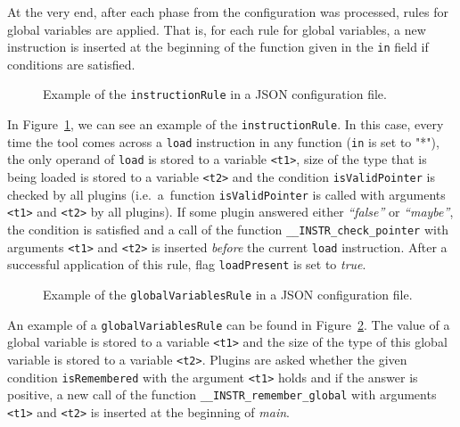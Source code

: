 At the very end, after each phase from the configuration was processed, rules
for global variables are applied. That is, for each rule for global variables,
    a new instruction is inserted at the beginning of the function given in the
    \texttt{in} field if conditions are satisfied.


\begin{figure}[t]

\caption{Example of the \texttt{instructionRule} in a JSON configuration file.}
\label{fig:json_example}
\end{figure}

In Figure~\ref{fig:json_example}, we can see an example of the
\texttt{instructionRule}. In this case, every time the tool comes across a
\texttt{load} instruction in any function (\texttt{in} is set to "*"), the only
operand of \texttt{load} is stored to a variable \texttt{<t1>}, size of the
type that is being loaded is stored to a variable \texttt{<t2>} and the condition
\texttt{isValidPointer} is checked by all plugins (i.e.~a~function
\texttt{isValidPointer} is called with arguments \texttt{<t1>} and
\texttt{<t2>} by all plugins). If some plugin answered either \emph{``false''} or
\emph{``maybe''}, the condition is satisfied and a call of the function
\texttt{\_\_INSTR\_check\_pointer} with arguments \texttt{<t1>} and
\texttt{<t2>} is inserted \emph{before} the current \texttt{load} instruction.
After a successful application of this rule, flag \texttt{loadPresent} is set
to \emph{true}.

\begin{figure}[t]

\caption{Example of the \texttt{globalVariablesRule} in a JSON configuration file.}
\label{fig:json_example2}
\end{figure}

An example of a \texttt{globalVariablesRule} can be found in
Figure~\ref{fig:json_example2}. The value of a global variable is stored to a
variable \texttt{<t1>} and the size of the type of this global variable is stored to
a variable \texttt{<t2>}. Plugins are asked whether the given condition
\texttt{isRemembered} with the argument \texttt{<t1>} holds and if the answer is
positive, a new call of the function \texttt{\_\_INSTR\_remember\_global} with
arguments \texttt{<t1>} and \texttt{<t2>} is inserted at the beginning of
\emph{main}.


